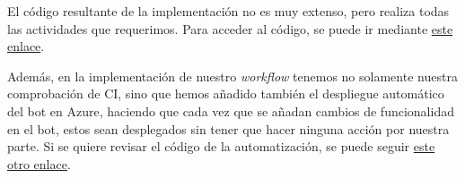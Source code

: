 El código resultante de la implementación no es muy extenso, pero realiza todas las 
actividades que requerimos. Para acceder al código, se puede ir mediante 
\href{https://github.com/jero-dev/proyecto-tfg/blob/main/src/bot/telegram/main.go}{este enlace}.

Además, en la implementación de nuestro \textit{workflow} 
tenemos no solamente nuestra comprobación de CI, sino que hemos añadido también el 
despliegue automático del bot en Azure, haciendo que cada vez que se añadan cambios 
de funcionalidad en el bot, estos sean desplegados sin tener que hacer ninguna 
acción por nuestra parte. Si se quiere revisar el código de la automatización, se 
puede seguir 
\href{https://github.com/jero-dev/proyecto-tfg/blob/main/.github/workflows/bot-telegram-ci.yml}{este otro enlace}.
